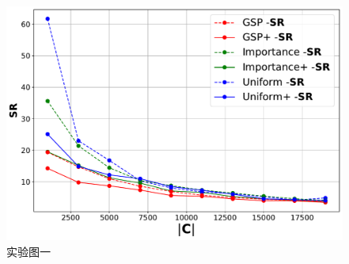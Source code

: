 \begin{figure}
\begin{minipage}{0.49\linewidth}
    \end{minipage}
    \hfill
    \begin{minipage}{0.49\linewidth}
        \centering
        \includegraphics[width=\linewidth]{./fig/time_ratio(0.2,0.05) - CIFAR-10.pdf}
    \end{minipage}
    \caption{实验图一}
\end{figure}
    




